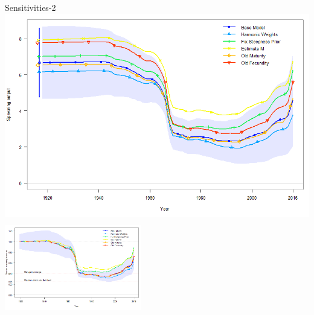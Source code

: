 \documentclass[pdf]{beamer}\usepackage[]{graphicx}\usepackage[]{color}
\begin{document}
\begin{frame}{Sensitivities-2}
    \includegraphics[scale = 0.20]{figures/ssb_sens1.png}
    \includegraphics[height = 1.65in, width = 2.35in]{figures/depl_sens1.png}
\end{frame}
\end{document}
